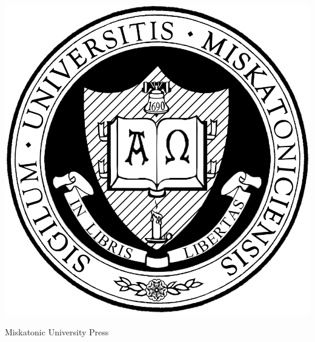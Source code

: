 \begin{titlepage}
\begin{center}
{} \\
\vspace{0.5cm}
\Large\textbf{\pdftitle} \\
\setmainfont{Times New Roman}

\vfill

\includegraphics[scale=.2]{miskatonic-university.jpg}

\vfill

\Large
Miskatonic University Press
\end{center}

\clearpage
\hspace{1pt}
\vfill


\end{titlepage}
